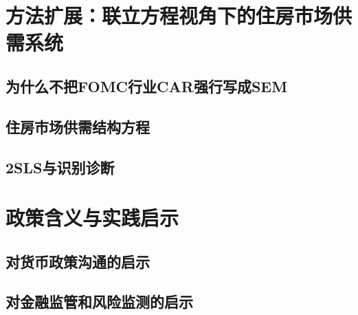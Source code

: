 \documentclass[UTF8,zihao=-4]{ctexart}
\begin{document}
\section{方法扩展：联立方程视角下的住房市场供需系统}

\subsection{为什么不把FOMC行业CAR强行写成SEM}


\subsection{住房市场供需结构方程}


\subsection{2SLS与识别诊断}


\section{政策含义与实践启示}

\subsection{对货币政策沟通的启示}


\subsection{对金融监管和风险监测的启示}

\end{document}
